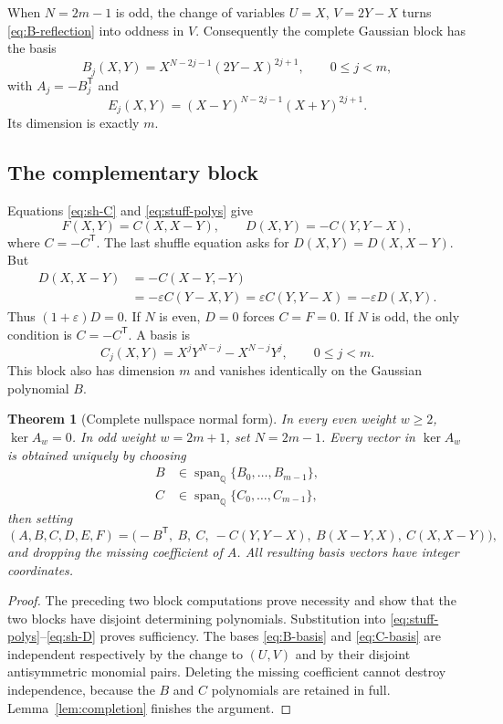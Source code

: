 \documentclass[11pt,a4paper]{article}
\numberwithin{equation}{section}
\newtheorem{theorem}{Theorem}[section]
\theoremstyle{definition}\newtheorem{definition}[theorem]{Definition}
\theoremstyle{remark}\newtheorem{remark}[theorem]{Remark}
\newcommand{\Q}{\mathbb Q}
\newcommand{\Span}{\operatorname{span}}
\newcommand{\rev}{\mathsf T}
\begin{document}
When $N=2m-1$ is odd, the change of variables $U=X$, $V=2Y-X$ turns
\eqref{eq:B-reflection} into oddness in $V$. Consequently the complete
Gaussian block has the basis
\begin{equation}
B_j(X,Y)=X^{N-2j-1}(2Y-X)^{2j+1},\qquad 0\le j<m,
\label{eq:B-basis}
\end{equation}
with $A_j=-B_j^\rev$ and
\begin{equation}
E_j(X,Y)=(X-Y)^{N-2j-1}(X+Y)^{2j+1}.
\label{eq:E-basis}
\end{equation}
Its dimension is exactly $m$.

\subsection{The complementary block}
Equations \eqref{eq:sh-C} and \eqref{eq:stuff-polys} give
\begin{equation}
F(X,Y)=C(X,X-Y),\qquad D(X,Y)=-C(Y,Y-X),
\label{eq:DF-from-C}
\end{equation}
where $C=-C^\rev$. The last shuffle equation asks for
$D(X,Y)=D(X,X-Y)$. But
\begin{align*}
D(X,X-Y)&=-C(X-Y,-Y)\\
&=-\varepsilon C(Y-X,Y)
 =\varepsilon C(Y,Y-X)=-\varepsilon D(X,Y).
\end{align*}
Thus $(1+\varepsilon)D=0$. If $N$ is even, $D=0$ forces $C=F=0$. If $N$ is
odd, the only condition is $C=-C^\rev$. A basis is
\begin{equation}
C_j(X,Y)=X^jY^{N-j}-X^{N-j}Y^j,\qquad 0\le j<m.
\label{eq:C-basis}
\end{equation}
This block also has dimension $m$ and vanishes identically on the Gaussian
polynomial $B$.

\begin{theorem}[Complete nullspace normal form]\label{thm:nullspace}
In every even weight $w\ge2$, $\ker A_w=0$. In odd weight $w=2m+1$, set
$N=2m-1$. Every vector in $\ker A_w$ is obtained uniquely by choosing
\begin{align*}
B&\in\Span_\Q\{B_0,\ldots,B_{m-1}\},\\
C&\in\Span_\Q\{C_0,\ldots,C_{m-1}\},
\end{align*}
then setting
\begin{equation}
(A,B,C,D,E,F)
 =\bigl(-B^\rev,\ B,\ C,\ -C(Y,Y-X),\ B(X-Y,X),\ C(X,X-Y)\bigr),
\label{eq:normal-form}
\end{equation}
and dropping the missing coefficient of $A$.
All resulting basis vectors have integer coordinates.
\end{theorem}
\begin{proof}
The preceding two block computations prove necessity and show that the two
blocks have disjoint determining polynomials. Substitution into
\eqref{eq:stuff-polys}--\eqref{eq:sh-D} proves sufficiency. The bases
\eqref{eq:B-basis} and \eqref{eq:C-basis} are independent respectively by the
change to $(U,V)$ and by their disjoint antisymmetric monomial pairs.
Deleting the missing coefficient cannot destroy independence, because the
$B$ and $C$ polynomials are retained in full. Lemma~\ref{lem:completion}
finishes the argument.
\end{proof}
\end{document}
